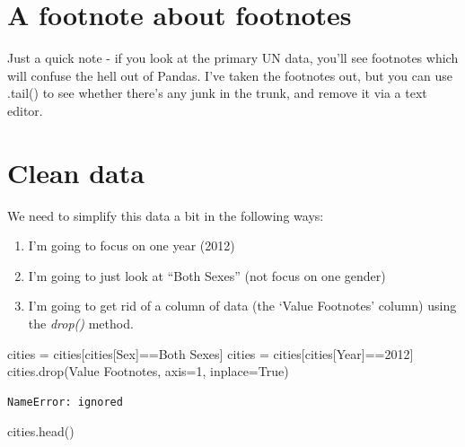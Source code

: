 \documentclass[
  letterpaper,
  DIV=11,
  numbers=noendperiod]{scrreprt}
\newenvironment{Shaded}{\begin{snugshade}}{\end{snugshade}}
\newcommand{\DecValTok}[1]{\textcolor[rgb]{0.68,0.00,0.00}{#1}}
\newcommand{\NormalTok}[1]{\textcolor[rgb]{0.00,0.23,0.31}{#1}}
\newcommand{\OperatorTok}[1]{\textcolor[rgb]{0.37,0.37,0.37}{#1}}
\newcommand{\StringTok}[1]{\textcolor[rgb]{0.13,0.47,0.30}{#1}}
\newcommand{\VariableTok}[1]{\textcolor[rgb]{0.07,0.07,0.07}{#1}}
\providecommand{\tightlist}{%
  \setlength{\itemsep}{0pt}\setlength{\parskip}{0pt}}\usepackage{longtable,booktabs,array}
\begin{document}
\hypertarget{a-footnote-about-footnotes}{%
\section{A footnote about footnotes}\label{a-footnote-about-footnotes}}

Just a quick note - if you look at the primary UN data, you'll see
footnotes which will confuse the hell out of Pandas. I've taken the
footnotes out, but you can use .tail() to see whether there's any junk
in the trunk, and remove it via a text editor.

\hypertarget{clean-data}{%
\section{Clean data}\label{clean-data}}

We need to simplify this data a bit in the following ways:

\begin{enumerate}
\def\labelenumi{\arabic{enumi}.}
\tightlist
\item
  I'm going to focus on one year (2012)
\item
  I'm going to just look at ``Both Sexes'' (not focus on one gender)
\item
  I'm going to get rid of a column of data (the `Value Footnotes'
  column) using the \emph{drop()} method.
\end{enumerate}

\begin{Shaded}
\begin{Highlighting}[]
\NormalTok{cities }\OperatorTok{=}\NormalTok{ cities[cities[}\StringTok{\textquotesingle{}Sex\textquotesingle{}}\NormalTok{]}\OperatorTok{==}\StringTok{\textquotesingle{}Both Sexes\textquotesingle{}}\NormalTok{]}
\NormalTok{cities }\OperatorTok{=}\NormalTok{ cities[cities[}\StringTok{\textquotesingle{}Year\textquotesingle{}}\NormalTok{]}\OperatorTok{==}\DecValTok{2012}\NormalTok{]}
\NormalTok{cities.drop(}\StringTok{\textquotesingle{}Value Footnotes\textquotesingle{}}\NormalTok{, axis}\OperatorTok{=}\DecValTok{1}\NormalTok{, inplace}\OperatorTok{=}\VariableTok{True}\NormalTok{)}
\end{Highlighting}
\end{Shaded}

\begin{verbatim}
NameError: ignored
\end{verbatim}

\begin{Shaded}
\begin{Highlighting}[]
\NormalTok{cities.head()}
\end{Highlighting}
\end{Shaded}
\end{document}
